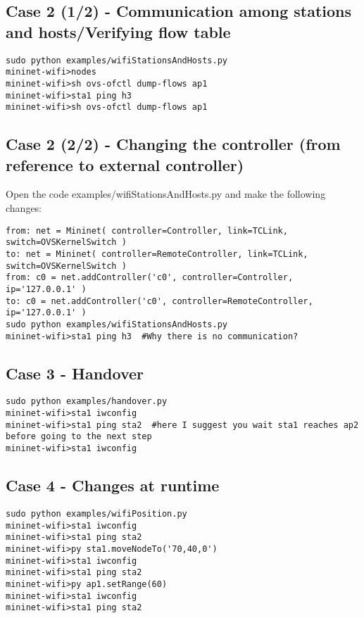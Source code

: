 \subsection{Case 2 (1/2) - Communication among stations and hosts/Verifying flow table}
\begin{verbatim}
sudo python examples/wifiStationsAndHosts.py  
mininet-wifi>nodes  
mininet-wifi>sh ovs-ofctl dump-flows ap1  
mininet-wifi>sta1 ping h3  
mininet-wifi>sh ovs-ofctl dump-flows ap1 
\end{verbatim}

\subsection{Case 2 (2/2) - Changing the controller (from reference to external controller)}

Open the code examples/wifiStationsAndHosts.py and make the following changes:

\begin{verbatim}
from: net = Mininet( controller=Controller, link=TCLink, switch=OVSKernelSwitch )  
to: net = Mininet( controller=RemoteController, link=TCLink, switch=OVSKernelSwitch )  
from: c0 = net.addController('c0', controller=Controller, ip='127.0.0.1' )  
to: c0 = net.addController('c0', controller=RemoteController, ip='127.0.0.1' )  
sudo python examples/wifiStationsAndHosts.py  
mininet-wifi>sta1 ping h3  #Why there is no communication? 
\end{verbatim}
  
\subsection{Case 3 - Handover}
\begin{verbatim}
sudo python examples/handover.py  
mininet-wifi>sta1 iwconfig  
mininet-wifi>sta1 ping sta2  #here I suggest you wait sta1 reaches ap2 before going to the next step
mininet-wifi>sta1 iwconfig  
\end{verbatim}
 
\subsection{Case 4 - Changes at runtime}
\begin{verbatim}
sudo python examples/wifiPosition.py  
mininet-wifi>sta1 iwconfig   
mininet-wifi>sta1 ping sta2  
mininet-wifi>py sta1.moveNodeTo('70,40,0')  
mininet-wifi>sta1 iwconfig  
mininet-wifi>sta1 ping sta2  
mininet-wifi>py ap1.setRange(60)  
mininet-wifi>sta1 iwconfig  
mininet-wifi>sta1 ping sta2  
\end{verbatim}

